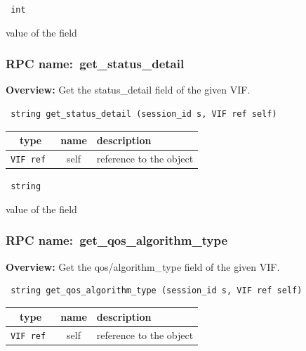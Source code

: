 \vspace{0.3cm}

{\tt 
int
}


value of the field
\vspace{0.3cm}
\vspace{0.3cm}
\vspace{0.3cm}
\subsubsection{RPC name:~get\_status\_detail}

{\bf Overview:} 
Get the status\_detail field of the given VIF.

\begin{verbatim} string get_status_detail (session_id s, VIF ref self)\end{verbatim}



 
\vspace{0.3cm}
\begin{tabular}{|c|c|p{7cm}|}
 \hline
{\bf type} & {\bf name} & {\bf description} \\ \hline
{\tt VIF ref } & self & reference to the object \\ \hline 

\end{tabular}

\vspace{0.3cm}

{\tt 
string
}


value of the field
\vspace{0.3cm}
\vspace{0.3cm}
\vspace{0.3cm}
\subsubsection{RPC name:~get\_qos\_algorithm\_type}

{\bf Overview:} 
Get the qos/algorithm\_type field of the given VIF.

\begin{verbatim} string get_qos_algorithm_type (session_id s, VIF ref self)\end{verbatim}



 
\vspace{0.3cm}
\begin{tabular}{|c|c|p{7cm}|}
 \hline
{\bf type} & {\bf name} & {\bf description} \\ \hline
{\tt VIF ref } & self & reference to the object \\ \hline 

\end{tabular}

